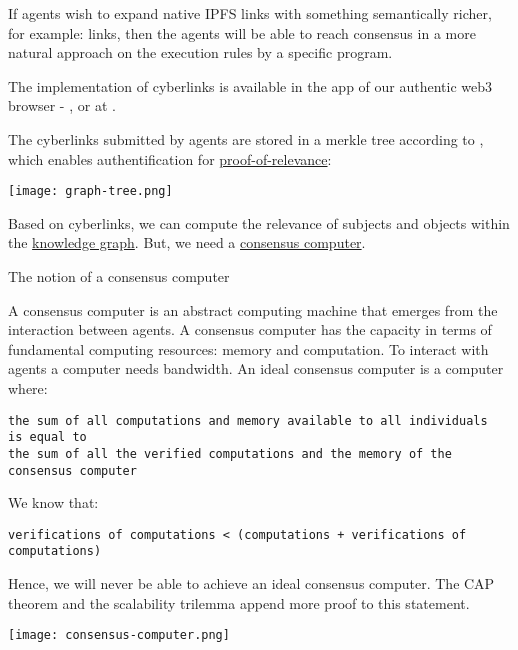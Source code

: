 \documentclass[8pt,oneside]{amsart}
\makeatletter
\newcommand{\linkred}[2]{\href{#1}{\color{red}{#2}}}
\newcommand{\linkgreen}[2]{\href{#1}{\color{green}{#2}}}
\renewcommand\subsection{\@startsection{subsection}
                                    {2}{\z@}
                                    {-3.25ex\@plus -1ex \@minus -.2ex}
                                    {0ex \@plus .2ex}
                                    {\play\Large}
                        }
\newcommand{\titleSection}[1]{\subsection{#1}}
\newenvironment{Figure}
  {\par\medskip\noindent\minipage{\linewidth}}
  {\endminipage\par\medskip}
\makeatother
\begin{document}
If agents wish to expand native IPFS links with something semantically richer, for example:
\linkred{https://github.com/cybercongress/cyb/blob/dev/docs/dura.md}{dura}
links, then the agents will be able to reach consensus in a more natural approach on the execution rules by a specific program.

The \linkred{https://github.com/cybercongress/cyberd}{сyberd} implementation of cyberlinks is available in the \linkred{https://github.com/cybercongress/dot-cyber}{.cyber} app of our authentic web3 browser - \linkred{https://cyb.ai}{cyb}, or at \linkred{http://cyber.page}{cyber.page}.

The cyberlinks submitted by agents are stored in a merkle tree according to \linkgreen{https://ipfs.io/ipfs/QmUUTW5gpJx7g5QF3PRkhjkk7jqs3r8EWcuVpZ9dHfx7DE}{RFC-6962 standard}, which enables authentification for {\hyperref[proof-of-relevance]{proof-of-relevance}}:

\begin{Figure}
    \centering
    \texttt{[image: graph-tree.png]}
\end{Figure}

Based on cyberlinks, we can compute the relevance of subjects and objects within the {\hyperref[knowledge-graph]{knowledge graph}}. But, we need a {\hyperref[consensus-computer]{consensus computer}}.

\titleSection{The notion of a consensus computer}\label{consensus-computer}

A consensus computer is an abstract computing machine that emerges from the interaction between agents. A consensus computer has the capacity in terms of fundamental computing resources: memory and computation. To interact with agents a computer needs bandwidth. An ideal consensus computer is a computer where:
\\
\begin{lstlisting}
the sum of all computations and memory available to all individuals
is equal to
the sum of all the verified computations and the memory of the consensus computer
\end{lstlisting}

We know that:
\begin{lstlisting}
verifications of computations < (computations + verifications of computations)
\end{lstlisting}

Hence, we will never be able to achieve an ideal consensus computer. The CAP theorem and the scalability trilemma append more proof to this statement.
\begin{Figure}
    \centering
    \texttt{[image: consensus-computer.png]}
\end{Figure}
\end{document}
